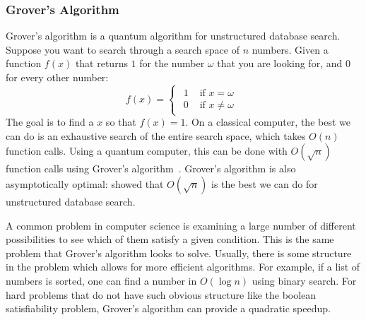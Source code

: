 \subsubsection{Grover's Algorithm}
Grover's algorithm is a quantum algorithm for unstructured database search.
Suppose you want to search through a search space of $n$ numbers.
Given a function $f(x)$ that returns $1$ for the number $\omega$ that you are looking for, and $0$ for every other number:
\begin{equation} \label{eqn:black-box-fn}
f(x) =
\begin{cases}
\begin{aligned}
1 & \text{ if } x = \omega \\
0 & \text{ if } x \neq \omega
\end{aligned}
\end{cases}
\end{equation}
The goal is to find a $x$ so that $f(x) = 1$.
On a classical computer, the best we can do is an exhaustive search of the entire search space, which takes $O(n)$ function calls.
Using a quantum computer, this can be done with $O(\sqrt{n})$ function calls using Grover's algorithm~\cite{grover1996fast}.
Grover's algorithm is also asymptotically optimal: \textcite{zalka1999grover} showed that $O(\sqrt{n})$ is the best we can do for unstructured database search.

A common problem in computer science is examining a large number of different possibilities to see which of them satisfy a given condition.
This is the same problem that Grover's algorithm looks to solve.
Usually, there is some structure in the problem which allows for more efficient algorithms.
For example, if a list of numbers is sorted, one can find a number in $O(\log n)$ using binary search.
For hard problems that do not have such obvious structure like the boolean satisfiability problem, Grover's algorithm can provide a quadratic speedup.

